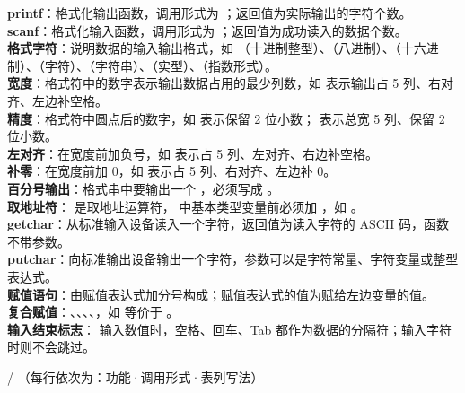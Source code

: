 \documentclass[a4paper,11pt]{article}
\begin{document}
\begin{keyterms}
\textbf{printf}：格式化输出函数，调用形式为 ；返回值为实际输出的字符个数。\\
\textbf{scanf}：格式化输入函数，调用形式为 ；返回值为成功读入的数据个数。\\
\textbf{格式字符}：说明数据的输入输出格式，如 （十进制整型）、（八进制）、（十六进制）、（字符）、（字符串）、（实型）、（指数形式）。\\
\textbf{宽度}：格式符中的数字表示输出数据占用的最少列数，如  表示输出占 5 列、右对齐、左边补空格。\\
\textbf{精度}：格式符中圆点后的数字，如  表示保留 2 位小数； 表示总宽 5 列、保留 2 位小数。\\
\textbf{左对齐}：在宽度前加负号，如  表示占 5 列、左对齐、右边补空格。\\
\textbf{补零}：在宽度前加 0，如  表示占 5 列、右对齐、左边补 0。\\
\textbf{百分号输出}：格式串中要输出一个 \code{\%}，必须写成 \code{\%\%}。\\
\textbf{取地址符}：\code{\&} 是取地址运算符， 中基本类型变量前必须加 \code{\&}，如 。\\
\textbf{getchar}：从标准输入设备读入一个字符，返回值为读入字符的 ASCII 码，函数不带参数。\\
\textbf{putchar}：向标准输出设备输出一个字符，参数可以是字符常量、字符变量或整型表达式。\\
\textbf{赋值语句}：由赋值表达式加分号构成；赋值表达式的值为赋给左边变量的值。\\
\textbf{复合赋值}：\code{+=}、\code{-=}、\code{*=}、\code{/=}、\code{\%=}，如  等价于 。\\
\textbf{输入结束标志}： 输入数值时，空格、回车、Tab 都作为数据的分隔符；输入字符时则不会跳过。
\end{keyterms}

\begin{contrast}{ / （每行依次为：功能·调用形式·表列写法）}
\end{contrast}
\end{document}

